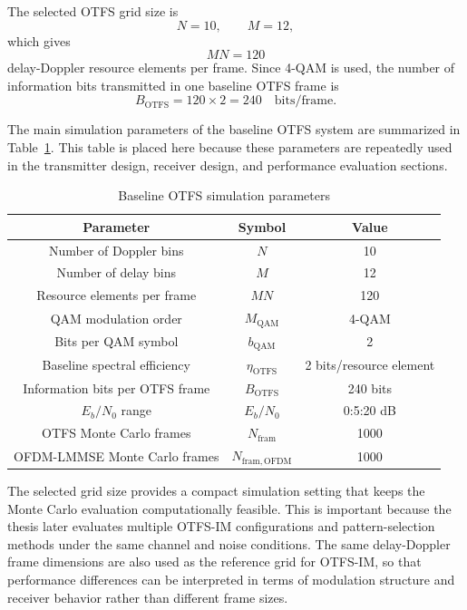 The selected OTFS grid size is
\begin{equation}
    N = 10, \qquad M = 12,
\end{equation}
which gives
\begin{equation}
    MN = 120
\end{equation}
delay-Doppler resource elements per frame. Since 4-QAM is used, the number of information bits transmitted in one baseline OTFS frame is
\begin{equation}
    B_{\mathrm{OTFS}} = 120 \times 2 = 240
    \quad \text{bits/frame}.
\end{equation}

The main simulation parameters of the baseline OTFS system are summarized in Table~\ref{tab:baseline_otfs_parameters}. This table is placed here because these parameters are repeatedly used in the transmitter design, receiver design, and performance evaluation sections.

\begin{table}[H]
    \centering
    \caption{Baseline OTFS simulation parameters}
    \label{tab:baseline_otfs_parameters}
    \begin{tabular}{c c c}
        \hline
        Parameter & Symbol & Value \\
        \hline
        Number of Doppler bins & \(N\) & 10 \\
        Number of delay bins & \(M\) & 12 \\
        Resource elements per frame & \(MN\) & 120 \\
        QAM modulation order & \(M_{\mathrm{QAM}}\) & 4-QAM \\
        Bits per QAM symbol & \(b_{\mathrm{QAM}}\) & 2 \\
        Baseline spectral efficiency & \(\eta_{\mathrm{OTFS}}\) & 2 bits/resource element \\
        Information bits per OTFS frame & \(B_{\mathrm{OTFS}}\) & 240 bits \\
        \(E_b/N_0\) range & \(E_b/N_0\) & 0:5:20 dB \\
        OTFS Monte Carlo frames & \(N_{\mathrm{fram}}\) & 1000 \\
        OFDM-LMMSE Monte Carlo frames & \(N_{\mathrm{fram,OFDM}}\) & 1000 \\
        \hline
    \end{tabular}
\end{table}

The selected grid size provides a compact simulation setting that keeps the Monte Carlo evaluation computationally feasible. This is important because the thesis later evaluates multiple OTFS-IM configurations and pattern-selection methods under the same channel and noise conditions. The same delay-Doppler frame dimensions are also used as the reference grid for OTFS-IM, so that performance differences can be interpreted in terms of modulation structure and receiver behavior rather than different frame sizes.

